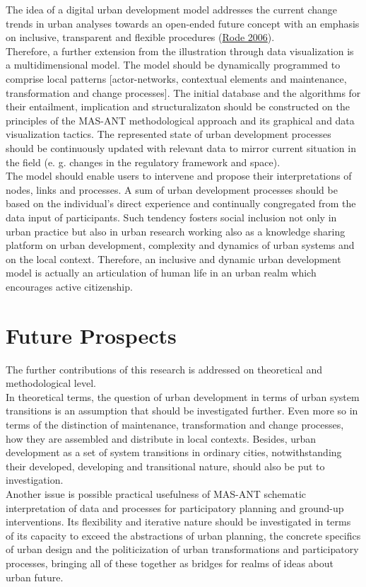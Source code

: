 \documentclass[11pt]{report}
\begin{document}
{The idea of a digital urban development model addresses the current change trends in urban analyses towards an open-ended future concept with an emphasis on inclusive, transparent and flexible procedures (\href{}{Rode 2006}).
\\
Therefore, a further extension from the illustration through data visualization is a multidimensional model.
The model should be dynamically programmed to comprise local patterns [actor-networks, contextual elements and maintenance, transformation and change processes].
The initial database and the algorithms for their entailment, implication and structuralizaton should be constructed on the principles of the MAS-ANT methodological approach and its graphical and data visualization tactics.
The represented state of urban development processes should be continuously updated with relevant data to mirror current situation in the field (e. g. changes in the regulatory framework and space).
\\
The model should enable users to intervene and propose their interpretations of nodes, links and processes.
A sum of urban development processes should be based on the individual's direct experience and continually congregated from the data input of participants.
Such tendency fosters social inclusion not only in urban practice but also in urban research working also as a knowledge sharing platform on urban development, complexity and dynamics of urban systems and on the local context.
Therefore, an inclusive and dynamic urban development model is actually an articulation of human life in an urban realm which encourages active citizenship.

\section{Future Prospects}

The further contributions of this research is addressed on theoretical and methodological level. 
\\
In theoretical terms, the question of urban development in terms of urban system transitions is an assumption that should be investigated further. Even more so in terms of the distinction of maintenance, transformation and change processes, how they are assembled and distribute in local contexts.
Besides, urban development as a set of system transitions in ordinary cities, notwithstanding their developed, developing and transitional nature, should also be put to investigation. 
\\
Another issue is possible practical usefulness of MAS-ANT schematic interpretation of data and processes for participatory planning and ground-up interventions.
Its flexibility and iterative nature should be investigated in terms of its capacity to exceed the abstractions of urban planning, the concrete specifics of urban design and the politicization of urban transformations and participatory processes, bringing all of these together as bridges for realms of ideas about urban future.

}
\end{document}

